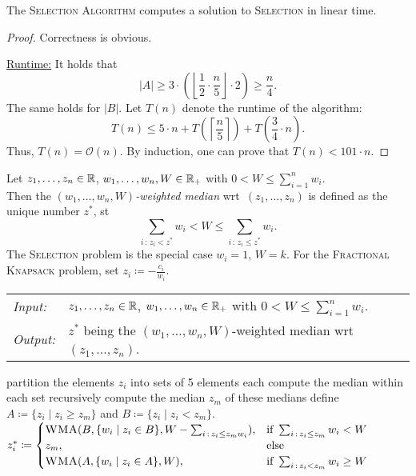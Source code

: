 \documentclass[../skript.tex]{subfiles}
\begin{document}
\vspace{-7pt}
\EndAlgorithmLine
\begin{theorem} %
The \textsc{Selection Algorithm} computes a solution to \textsc{Selection} in linear time.
\end{theorem}
\begin{proof}
Correctness is obvious.

\underline{Runtime:} It holds that
\[
	|A| \geq 3 \cdot \left( \left\lfloor \frac{1}{2} \cdot \frac{n}{5} \right\rfloor \cdot 2 \right) \geq \frac{n}{4}.
\]
The same holds for $|B|$.
Let $T(n)$ denote the runtime of the algorithm:
\[
	T(n) \leq 5 \cdot n + T \left( \left\lceil \frac{n}{5} \right\rceil \right) + T \left( \frac{3}{4} \cdot n \right).
\]
Thus, $T(n) = \mathcal{O}(n)$. By induction, one can prove that $T(n) < 101 \cdot n$.
\end{proof}
Let $z_1, \ldots, z_n \in \mathbb{R}$, $w_1, \ldots, w_n, W \in \mathbb{R}_+$ with $0 < W \leq \sum_{i=1}^n w_i$. \\
Then the \emph{$(w_1, \ldots, w_n, W)$-weighted median} \ac{wrt}\ $(z_1, \ldots, z_n)$ is defined as the unique number $z^*$, \ac{st}
\[
	\sum_{i \,:\, z_i < z^*} w_i < W \leq \sum_{i \,:\, z_i \leq z^*} w_i.
\]
The \textsc{Selection} problem is the special case $w_i = 1$, $W = k$.
For the \textsc{Fractional Knapsack} problem, set $z_i \coloneqq - \frac{c_i}{w_i}$.
\begin{samepage}
\begin{algorithmbox}
\begin{tabular}{@{}ll}
\textit{Input:} & $z_1, \ldots, z_n \in \mathbb{R}$, $w_1, \ldots, w_n \in \mathbb{R}_+$ with $0 < W \leq \sum_{i=1}^n w_i$. \\
\textit{Output:} & $z^*$ being the $(w_1, \ldots, w_n, W)$-weighted median \ac{wrt}\ $(z_1, \ldots, z_n)$.
\end{tabular}
\end{algorithmbox}
\vspace{-7pt}
\begin{algorithm}[H]
partition the elements $z_i$ into sets of 5 elements each\;
compute the median within each set\;
recursively compute the median $z_m$ of these medians\;
define $A \coloneqq \{ z_i \mid z_i \geq z_m \}$ and $B \coloneqq \{ z_i \mid z_i < z_m \}$.\;
$z_i^* \coloneqq \begin{cases}
\textsc{WMA}(B, \{ w_i \mid z_i \in B \}, W - \sum_{i \,:\, z_i \leq z_m w_i}), & \text{if } \sum_{i \,:\, z_i \leq z_m} w_i < W \\
z_m, & \text{else} \\
\textsc{WMA}(A, \{ w_i \mid z_i \in A \}, W), & \text{if } \sum_{i \,:\, z_i < z_m} w_i \geq W
\end{cases}$\;
\end{algorithm}
\vspace{-7pt}
\EndAlgorithmLine
\end{samepage}
\end{document}

